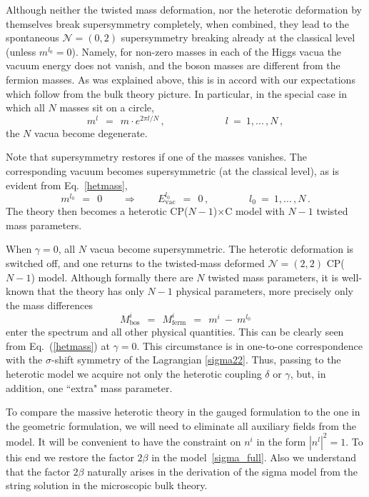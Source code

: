 \documentclass[12pt]{article}
\newcommand{\ntwot}{${\mathcal N}= \left(2,2\right) $ }
\newcommand{\ntwoo}{${\mathcal N}= \left(0,2\right) $ }
\newcommand{\CPC}{CP($N-1$)$\times$C }
\begin{document}
	Although neither the twisted mass deformation, nor the heterotic deformation by themselves break supersymmetry completely, when combined, they lead to the spontaneous \ntwoo supersymmetry breaking
	already at the classical level (unless $m^{l_0}=0$).
 Namely, for non-zero masses 
in each of the Higgs vacua
the vacuum energy does not vanish,  and the boson masses are different from the fermion masses. As was explained
above, this is in accord with our expectations which follow
from the bulk theory picture. In particular, in the special case in which all $N$ masses sit on a circle, 
\[
	m^l ~~=~~ m \cdot e^{2\pi l/N}\,, \qquad\qquad\qquad  l ~=~ 1,...\,, N\,,
\]
	the $ N $ vacua become degenerate.

	Note that supersymmetry restores if one of the masses vanishes.
	The corresponding vacuum becomes supersymmetric
	(at the classical level), as is evident from 
	Eq.~\eqref{hetmass},
\[
	m^{l_0} ~~=~~ 0  \qquad \Rightarrow \qquad E_\text{vac}^{l_0} ~~=~~ 0\,, \qquad\qquad l_0 ~=~ 1,...\,, N\,.
\]
	The theory then becomes a heterotic \CPC model with $ N - 1 $ twisted mass parameters.

	When $ \gamma = 0 $,   all $ N $ vacua become supersymmetric.
	The heterotic deformation is switched off,
	 and one returns to the twisted-mass deformed \ntwot CP($N-1$) model.
	Although formally there are $ N $ twisted mass parameters, it is well-known that the theory 
	has only $ N - 1 $ physical parameters, more precisely only the mass differences
\[
	M_\text{bos}^i ~~=~~ M_\text{ferm}^i ~~=~~ m^i ~-~ m^{l_0}
\]
enter the spectrum and all other physical
quantities. This can be clearly seen from 
Eq.~(\ref{hetmass}) at $\gamma =0$. This circumstance is in one-to-one correspondence
with the $\sigma$-shift symmetry of 
the Lagrangian \eqref{sigma22}. Thus, passing
to the heterotic model we acquire not only the heterotic coupling $\delta$ or $\gamma$,
but, in addition, one ``extra" mass parameter.
	
        To compare the massive heterotic theory in the gauged  formulation to
        the one in the geometric formulation, we will need to eliminate all auxiliary fields from the model. It will be convenient  to have the constraint on $n^i$ in the
        form $ | n^l |^2 = 1 $. To this end we restore the factor 
        $ 2\beta $ in  the model~\eqref{sigma_full}.
        Also we understand that the factor   $ 2\beta $  naturally arises in the 
derivation of  the sigma model from the   string
solution in the microscopic bulk theory.
\end{document}
